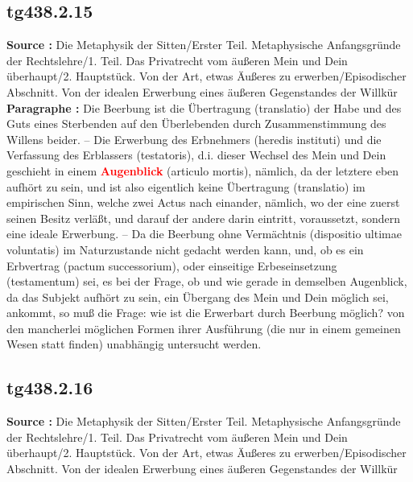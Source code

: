 \documentclass[a4paper,12pt,twoside]{book}
\newcommand{\match}[1]{\textcolor{red}{\textbf{#1}}}
\begin{document}
	\subsection*{tg438.2.15} 
	\textbf{Source : }Die Metaphysik der Sitten/Erster Teil. Metaphysische Anfangsgründe der Rechtslehre/1. Teil. Das Privatrecht vom äußeren Mein und Dein überhaupt/2. Hauptstück. Von der Art, etwas Äußeres zu erwerben/Episodischer Abschnitt. Von der idealen Erwerbung eines äußeren Gegenstandes der Willkür\\  
	
	\textbf{Paragraphe : }Die Beerbung ist die Übertragung (translatio) der Habe und des Guts eines Sterbenden auf den Überlebenden durch Zusammenstimmung des Willens beider. – Die Erwerbung des Erbnehmers (heredis instituti) und die Verfassung des Erblassers (testatoris), d.i. dieser Wechsel des Mein und Dein geschieht in einem \match{Augenblick} (articulo mortis), nämlich, da der letztere eben aufhört zu sein, und ist also eigentlich keine Übertragung (translatio) im empirischen Sinn, welche zwei Actus nach einander, nämlich, wo der eine zuerst seinen Besitz verläßt, und darauf der andere darin eintritt, voraussetzt, sondern eine ideale Erwerbung. – Da die Beerbung ohne Vermächtnis (dispositio ultimae voluntatis) im Naturzustande nicht gedacht werden kann, und, ob es ein Erbvertrag (pactum successorium), oder einseitige Erbeseinsetzung (testamentum) sei, es bei der Frage, ob und wie gerade in demselben Augenblick, da das Subjekt aufhört zu sein, ein Übergang des Mein und Dein möglich sei, ankommt, so muß die Frage: wie ist die Erwerbart durch Beerbung möglich? von den mancherlei möglichen Formen ihrer Ausführung (die nur in einem gemeinen Wesen statt finden) unabhängig untersucht werden. 
	
	\subsection*{tg438.2.16} 
	\textbf{Source : }Die Metaphysik der Sitten/Erster Teil. Metaphysische Anfangsgründe der Rechtslehre/1. Teil. Das Privatrecht vom äußeren Mein und Dein überhaupt/2. Hauptstück. Von der Art, etwas Äußeres zu erwerben/Episodischer Abschnitt. Von der idealen Erwerbung eines äußeren Gegenstandes der Willkür\\  
	
\end{document}
